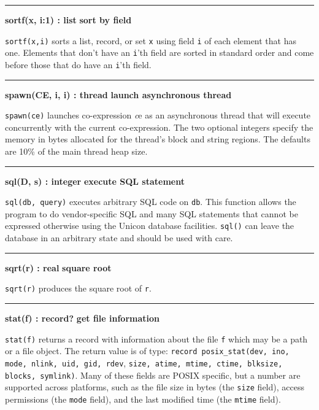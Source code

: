 \bigskip\hrule\vspace{0.1cm}
\noindent
{\bf sortf(x, i:1) : list } \hfill {\bf sort by field}

\noindent
{}\texttt{sortf(x,i)} sorts a list, record, or set
\texttt{x} using field \texttt{i} of each element that has one.
Elements that don't have an
\texttt{i}'th field are sorted in standard order and
come before those that do have an \texttt{i}'th field.

\bigskip\hrule\vspace{0.1cm}
\noindent
{\bf spawn(CE, i, i) : thread } \hfill {\bf launch asynchronous thread}

\noindent
{}\texttt{spawn(ce)} launches co-expression {\textit ce} as an
asynchronous thread that will execute concurrently with the current
co-expression. The two optional integers specify the memory in bytes
allocated for the thread's block and string regions. The defaults are 10\%
of the main thread heap size.

\bigskip\hrule\vspace{0.1cm}
\noindent
{\bf sql(D, s) : integer } \hfill {\bf execute SQL statement}

\noindent
{}\texttt{sql(db, query)} executes arbitrary SQL code on
\texttt{db}. This function allows the program to do vendor-specific SQL
and many SQL statements that cannot be expressed otherwise using the
Unicon database facilities. \texttt{sql()} can leave the database in an
arbitrary state and should be used with care.

\bigskip\hrule\vspace{0.1cm}
\noindent
{\bf sqrt(r) : real } \hfill {\bf square root}

\noindent
{}\texttt{sqrt(r)} produces the square root of
\texttt{r}.

\bigskip\hrule\vspace{0.1cm}
\noindent
{\bf stat(f) : record? } \hfill {\bf get file information}

\noindent
{}\texttt{stat(f)} returns a record
with information about the file \texttt{f} which may be a path or a
file object. The return value is of type:
\texttt{record posix\_stat(dev, ino, mode, nlink, uid, gid, rdev},
\texttt{size, atime, mtime, ctime, blksize, blocks, symlink)}.
Many of these fields are POSIX
specific, but a number are supported across platforms, such as the
file size in bytes (the \texttt{size} field), access
permissions (the \texttt{mode} field), and the last modified time (the
\texttt{mtime} field).

